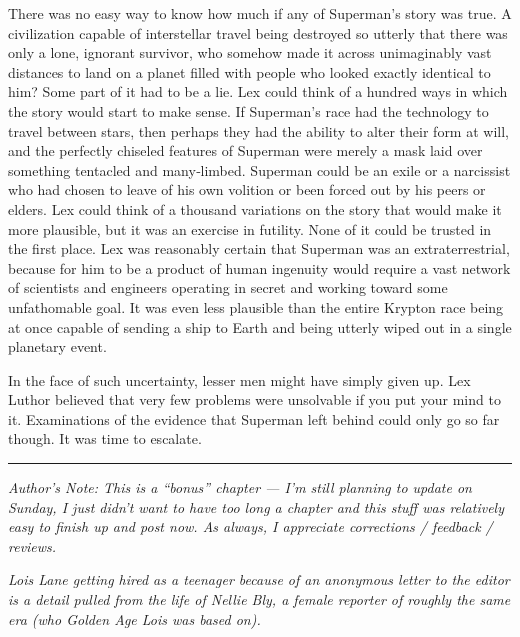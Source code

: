 There was no easy way to know how much if any of Superman's story was
true. A civilization capable of interstellar travel being destroyed so
utterly that there was only a lone, ignorant survivor, who somehow made
it across unimaginably vast distances to land on a planet filled with
people who looked exactly identical to him? Some part of it had to be a
lie. Lex could think of a hundred ways in which the story would start to
make sense. If Superman's race had the technology to travel between
stars, then perhaps they had the ability to alter their form at will,
and the perfectly chiseled features of Superman were merely a mask laid
over something tentacled and many‐limbed. Superman could be an exile or
a narcissist who had chosen to leave of his own volition or been forced
out by his peers or elders. Lex could think of a thousand variations on
the story that would make it more plausible, but it was an exercise in
futility. None of it could be trusted in the first place. Lex was
reasonably certain that Superman was an extraterrestrial, because for
him to be a product of human ingenuity would require a vast network of
scientists and engineers operating in secret and working toward some
unfathomable goal. It was even less plausible than the entire Krypton
race being at once capable of sending a ship to Earth and being utterly
wiped out in a single planetary event.

In the face of such uncertainty, lesser men might have simply given up.
Lex Luthor believed that very few problems were unsolvable if you put
your mind to it. Examinations of the evidence that Superman left behind
could only go so far though. It was time to escalate.

\begin{center}\rule{0.5\linewidth}{\linethickness}\end{center}

\emph{Author's Note: This is a ``bonus'' chapter --- I'm still planning
to update on Sunday, I just didn't want to have too long a chapter and
this stuff was relatively easy to finish up and post now. As always, I
appreciate corrections / feedback / reviews.}

\emph{Lois Lane getting hired as a teenager because of an anonymous
letter to the editor is a detail pulled from the life of Nellie Bly, a
female reporter of roughly the same era (who Golden Age Lois was based
on).}
